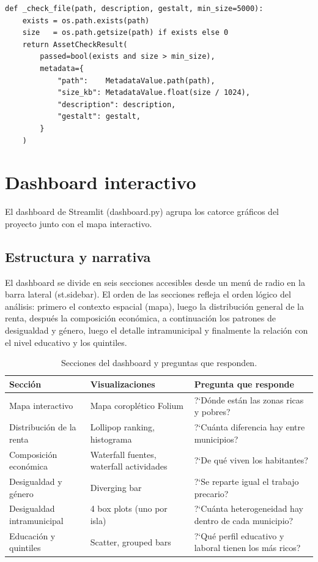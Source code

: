 \documentclass[spanish,a4paper,12pt,oneside]{extreport}
\begin{document}
\begin{lstlisting}[caption={Función auxiliar compartida por todos los checks de archivo.}]
def _check_file(path, description, gestalt, min_size=5000):
    exists = os.path.exists(path)
    size   = os.path.getsize(path) if exists else 0
    return AssetCheckResult(
        passed=bool(exists and size > min_size),
        metadata={
            "path":    MetadataValue.path(path),
            "size_kb": MetadataValue.float(size / 1024),
            "description": description,
            "gestalt": gestalt,
        }
    )
\end{lstlisting}

\chapter{Dashboard interactivo}

El dashboard de Streamlit (dashboard.py) agrupa los catorce gráficos del proyecto junto con el mapa interactivo.

\section{Estructura y narrativa}

El dashboard se divide en seis secciones accesibles desde un menú de radio en la barra lateral (st.sidebar). El orden de las secciones refleja el orden lógico del análisis: primero el contexto espacial (mapa), luego la distribución general de la renta, después la composición económica, a continuación los patrones de desigualdad y género, luego el detalle intramunicipal y finalmente la relación con el nivel educativo y los quintiles.

\begin{table}[H]
\centering
\small
\begin{tabular}{lp{4.5cm}p{5.5cm}}
\toprule
Sección & Visualizaciones & Pregunta que responde \\
\midrule
Mapa interactivo & Mapa coroplético Folium & ?`Dónde están las zonas ricas y pobres? \\
\addlinespace
Distribución de la renta & Lollipop ranking, histograma & ?`Cuánta diferencia hay entre municipios? \\
\addlinespace
Composición económica & Waterfall fuentes, waterfall actividades & ?`De qué viven los habitantes? \\
\addlinespace
Desigualdad y género & Diverging bar & ?`Se reparte igual el trabajo precario? \\
\addlinespace
Desigualdad intramunicipal & 4 box plots (uno por isla) & ?`Cuánta heterogeneidad hay dentro de cada municipio? \\
\addlinespace
Educación y quintiles & Scatter, grouped bars & ?`Qué perfil educativo y laboral tienen los más ricos? \\
\bottomrule
\end{tabular}
\caption{Secciones del dashboard y preguntas que responden.}
\end{table}
\end{document}
